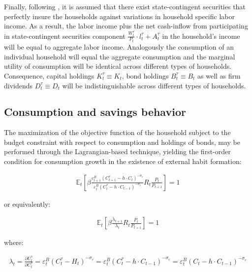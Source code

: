 \documentclass{pracamgr}
\numberwithin{equation}{section}
\begin{document}
Finally, following \citet{christiano2005nominal}, it is assumed that there exist state-contingent securities that perfectly insure the households against variations in household specific labor income. As a result, the labor income plus the net cash-inflow from participating in state-contingent securities component $\frac{W_{t}^{\tau}}{P_{t}} \cdot l_{t}^{\tau} + A_{t}^{\tau}$ in the household's income will be equal to aggregate labor income. Analogously the consumption of an individual household will equal the aggregate consumption and the marginal utility of consumption will be identical across different types of households. Consequence, capital holdings $K_{t}^{\tau} \equiv K_{t}$, bond holdings $B_{t}^{\tau} \equiv B_{t}$ as well as firm dividends  $D_{t}^{\tau} \equiv D_{t}$ will be indistinguishable across different types of households.

\subsection{Consumption and savings behavior} \label{Consumption and savings behavior}

The maximization of the objective function of the household subject to the budget constraint with respect to consumption and holdings of bonds, may be performed through the Lagrangian-based technique, yielding the first-order condition for consumption growth in the existence of external habit formation:

\begin{align}
\mathbb{E}_{t} \left[ \beta \frac{\varepsilon_{t+1}^{B} (C_{t+1}^{\tau} - h \cdot C_{t} )^{-\sigma_{c}}}{\varepsilon_{t}^{B} (C_{t}^{\tau} - h \cdot C_{t-1} )^{-\sigma_{c}}} R_{t} \frac{P_{t}}{P_{t+1}} \right] = 1
\end{align}

or equivalently:

\begin{align}
\mathbb{E}_{t} \left[ \beta \frac{\lambda_{t+1}}{\lambda_{t}} R_{t} \frac{P_{t}}{P_{t+1}} \right] = 1
\end{align}

where:

\begin{align}
\lambda_{t} = \frac{\partial U_{t}^{\tau}}{\partial C_{t}^{\tau}} = \varepsilon_{t}^{B} (C_{t}^{\tau} - H_{t} )^{-\sigma_{c}} = \varepsilon_{t}^{B} (C_{t}^{\tau} - h \cdot C_{t-1} )^{-\sigma_{c}} = \varepsilon_{t}^{B} (C_{t} - h \cdot C_{t-1} )^{-\sigma_{c}}
\end{align}
\end{document}
